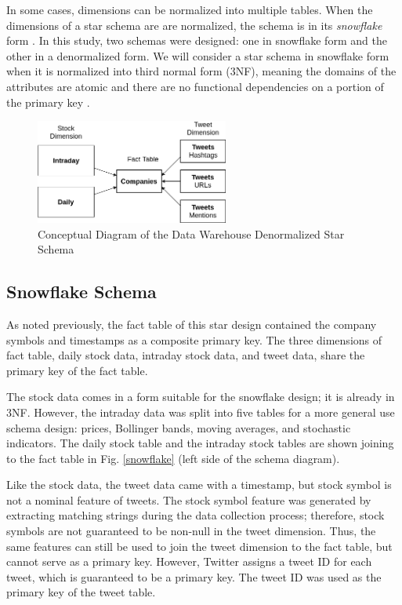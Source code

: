 \documentclass[journal]{IEEEtran}
\begin{document}
In some cases, dimensions can be normalized into multiple tables. 
When the dimensions of a star schema are are normalized, the schema
 is in its \textit{snowflake} form \cite{WarehouseDesignApproaches}.
In this study, two schemas were designed: one in snowflake form and
 the other in a denormalized form.
We will consider a star schema in snowflake form when it is normalized into
 third normal form (3NF), meaning the domains of the attributes are atomic and
 there are no functional dependencies on a portion of the primary key \cite{DSCNormalization}.


\begin{figure}
	\centering
	\includegraphics[width=2.5in]{Star_Schema_Simple.png}
	\caption{Conceptual Diagram of the Data Warehouse 
		Denormalized Star Schema}
	\label{star}
\end{figure}

\subsection{Snowflake Schema}

As noted previously, the fact table of this star design contained the
 company symbols and timestamps as a composite primary key.
The three dimensions of fact table, daily stock data, intraday stock data, and 
 tweet data, share the primary key of the fact table.

The stock data comes in a form suitable for the snowflake design; 
 it is already in 3NF.
However, the intraday data was split into five tables for a more 
 general use schema design: prices, Bollinger bands, moving averages,
 and stochastic indicators.
The daily stock table and the intraday stock tables are shown joining to the 
 fact table in Fig. \ref{snowflake} (left side of the schema diagram).

Like the stock data, the tweet data came with a timestamp, but stock symbol
 is not a nominal feature of tweets.
The stock symbol feature was generated by extracting matching strings
 during the data collection process; therefore, stock symbols are not
 guaranteed to be non-null in the tweet dimension.
Thus, the same features can still be used to join the tweet dimension to the 
fact table, but cannot serve as a primary key.
However, Twitter assigns a tweet ID for each tweet, which is guaranteed to be
 a primary key.
The tweet ID was used as the primary key of the tweet table.
\end{document}
